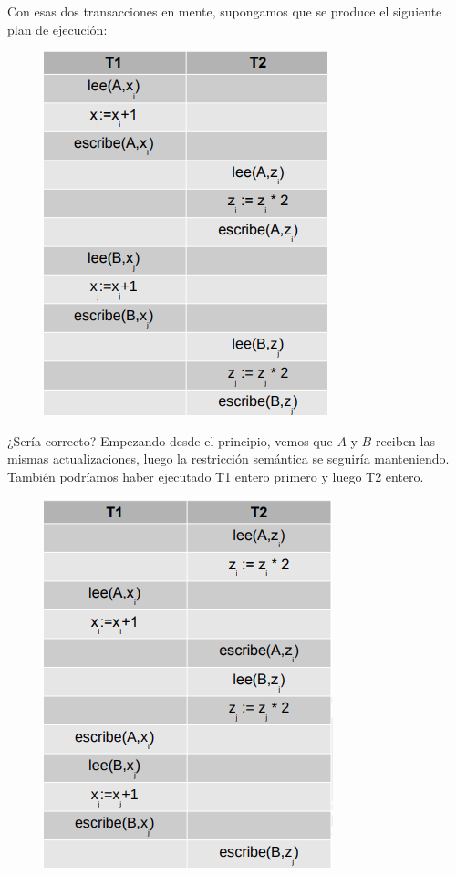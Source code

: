 Con esas dos transacciones en mente, supongamos que se produce el siguiente plan de ejecución:

\begin{figure}[H]
  \center
  \includegraphics[scale=0.5]{img/27.png}
\end{figure}

¿Sería correcto? Empezando desde el principio, vemos que $A$ y $B$ reciben las mismas actualizaciones, luego la restricción semántica se seguiría manteniendo. También podríamos haber ejecutado T1 entero primero y luego T2 entero.

\begin{figure}[H]
  \center
  \includegraphics[scale=0.5]{img/28.png}
\end{figure}

